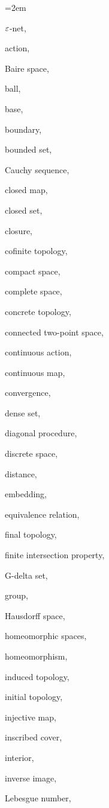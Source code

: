 {%
\scriptsize
\begin{list}{}{\leftmargin=2em}
  \item $\varepsilon$-net,
  \item action,
  \item Baire space,
  \item ball,
  \item base,
  \item boundary,
  \item bounded set,
  \item Cauchy sequence,
  \item closed map,
  \item closed set,
  \item closure,
  \item cofinite topology,
  \item compact space,
  \item complete space,
  \item concrete topology,
  \item connected two-point space,
  \item continuous action,
  \item continuous map,
  \item convergence,
  \item dense set,
  \item diagonal procedure,
  \item discrete space,
  \item distance,
  \item embedding,
  \item equivalence relation,
  \item final topology,
  \item finite intersection property,
  \item G-delta set,
  \item group,
  \item Hausdorff space,
  \item homeomorphic spaces,
  \item homeomorphism,
  \item induced topology,
  \item initial topology,
  \item injective map,
  \item inscribed cover,
  \item interior,
  \item inverse image,
  \item Lebesgue number,

\end{list}}
